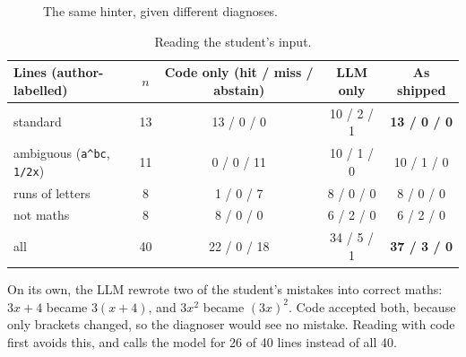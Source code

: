 \documentclass[11pt,a4paper]{article}
\newcommand{\code}[1]{\texttt{#1}}
\newcommand{\best}[1]{\textbf{#1}}
\begin{document}
\begin{figure}[H]
\centering
{}
\caption{The same hinter, given different diagnoses.}
\label{fig:hinter}
\end{figure}
\begin{table}[H]
\centering\small
\begin{tabular}{@{}lcccc@{}}
\toprule
Lines (author-labelled) & $n$ & Code only (hit / miss / abstain) & LLM only & As shipped \\
\midrule
standard & 13 & 13 / 0 / 0 & 10 / 2 / 1 & \best{13 / 0 / 0} \\
ambiguous (\code{a\^{}bc}, \code{1/2x}) & 11 & 0 / 0 / 11 & 10 / 1 / 0 & 10 / 1 / 0 \\
runs of letters & 8 & 1 / 0 / 7 & 8 / 0 / 0 & 8 / 0 / 0 \\
not maths & 8 & 8 / 0 / 0 & 6 / 2 / 0 & 6 / 2 / 0 \\
\midrule
all & 40 & 22 / 0 / 18 & 34 / 5 / 1 & \best{37 / 3 / 0} \\
\bottomrule
\end{tabular}
\caption{Reading the student's input.}
\label{tab:format}
\end{table}
On its own, the LLM rewrote two of the student's mistakes into correct maths: $3x + 4$ became $3(x + 4)$, and $3x^2$ became $(3x)^2$. Code accepted both, because only brackets changed, so the diagnoser would see no mistake. Reading with code first avoids this, and calls the model for 26 of 40 lines instead of all 40.
\end{document}
